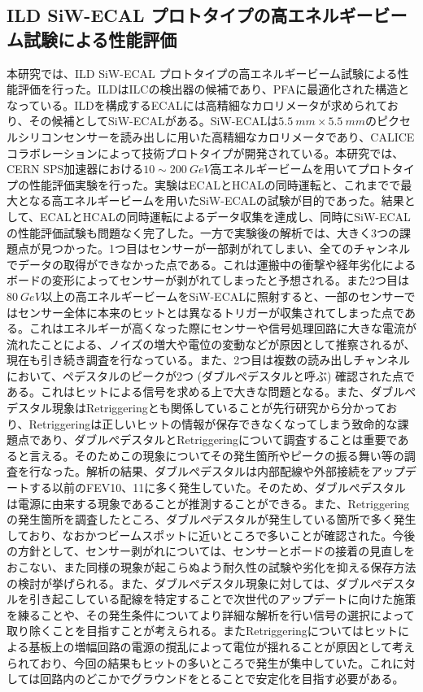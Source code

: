 \subsection*{ILD SiW-ECAL プロトタイプの高エネルギービーム試験による性能評価}
本研究では、ILD SiW-ECAL プロトタイプの高エネルギービーム試験による性能評価を行った。ILDはILCの検出器の候補であり、PFAに最適化された構造となっている。ILDを構成するECALには高精細なカロリメータが求められており、その候補としてSiW-ECALがある。SiW-ECALは$\SI{5.5}{mm} \times \SI{5.5}{mm}$のピクセルシリコンセンサーを読み出しに用いた高精細なカロリメータであり、CALICEコラボレーションによって技術プロトタイプが開発されている。本研究では、CERN SPS加速器における$10 \sim \SI{200}{GeV}$高エネルギービームを用いてプロトタイプの性能評価実験を行った。実験はECALとHCALの同時運転と、これまでで最大となる高エネルギービームを用いたSiW-ECALの試験が目的であった。結果として、ECALとHCALの同時運転によるデータ収集を達成し、同時にSiW-ECALの性能評価試験も問題なく完了した。一方で実験後の解析では、大きく3つの課題点が見つかった。1つ目はセンサーが一部剥がれてしまい、全てのチャンネルでデータの取得ができなかった点である。これは運搬中の衝撃や経年劣化によるボードの変形によってセンサーが剥がれてしまったと予想される。また2つ目は$\SI{80}{GeV}$以上の高エネルギービームをSiW-ECALに照射すると、一部のセンサーではセンサー全体に本来のヒットとは異なるトリガーが収集されてしまった点である。これはエネルギーが高くなった際にセンサーや信号処理回路に大きな電流が流れたことによる、ノイズの増大や電位の変動などが原因として推察されるが、現在も引き続き調査を行なっている。また、2つ目は複数の読み出しチャンネルにおいて、ペデスタルのピークが2つ (ダブルぺデスタルと呼ぶ) 確認された点である。これはヒットによる信号を求める上で大きな問題となる。また、ダブルぺデスタル現象はRetriggeringとも関係していることが先行研究から分かっており、Retriggeringは正しいヒットの情報が保存できなくなってしまう致命的な課題点であり、ダブルぺデスタルとRetriggeringについて調査することは重要であると言える。そのためこの現象についてその発生箇所やピークの振る舞い等の調査を行なった。解析の結果、ダブルぺデスタルは内部配線や外部接続をアップデートする以前のFEV10、11に多く発生していた。そのため、ダブルぺデスタルは電源に由来する現象であることが推測することができる。また、Retriggeringの発生箇所を調査したところ、ダブルぺデスタルが発生している箇所で多く発生しており、なおかつビームスポットに近いところで多いことが確認された。今後の方針として、センサー剥がれについては、センサーとボードの接着の見直しをおこない、また同様の現象が起こらぬよう耐久性の試験や劣化を抑える保存方法の検討が挙げられる。また、ダブルぺデスタル現象に対しては、ダブルぺデスタルを引き起こしている配線を特定することで次世代のアップデートに向けた施策を練ることや、その発生条件についてより詳細な解析を行い信号の選択によって取り除くことを目指すことが考えられる。またRetriggeringについてはヒットによる基板上の増幅回路の電源の撹乱によって電位が揺れることが原因として考えられており、今回の結果もヒットの多いところで発生が集中していた。これに対しては回路内のどこかでグラウンドをとることで安定化を目指す必要がある。


